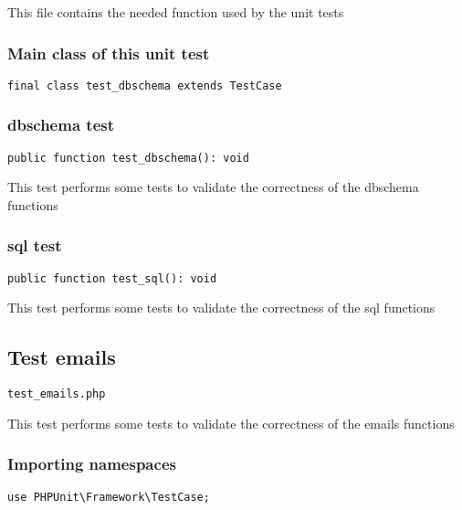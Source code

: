 \documentclass[a4paper]{article}
\begin{document}
This file contains the needed function used by the unit tests

\hypertarget{toc136}{}
\subsubsection{Main class of this unit test}

\begin{lstlisting}
final class test_dbschema extends TestCase
\end{lstlisting}

\hypertarget{toc137}{}
\subsubsection{dbschema test}

\begin{lstlisting}
public function test_dbschema(): void
\end{lstlisting}

This test performs some tests to validate the correctness
of the dbschema functions

\hypertarget{toc138}{}
\subsubsection{sql test}

\begin{lstlisting}
public function test_sql(): void
\end{lstlisting}

This test performs some tests to validate the correctness
of the sql functions

\hypertarget{toc139}{}
\subsection{Test emails}

\begin{lstlisting}
test_emails.php
\end{lstlisting}

This test performs some tests to validate the correctness
of the emails functions

\hypertarget{toc140}{}
\subsubsection{Importing namespaces}

\begin{lstlisting}
use PHPUnit\Framework\TestCase;
\end{lstlisting}
\end{document}
